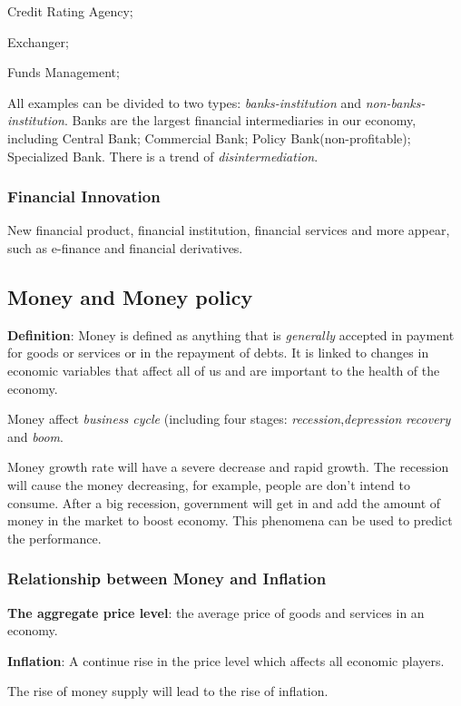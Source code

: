 \documentclass[10pt, a4paper]{article}
\begin{document}
            \quad Credit Rating Agency; 

            \quad Exchanger; 
            
            \quad Funds Management; 

        All examples can be divided to two types: \emph{banks-institution} and \emph{non-banks-institution}. Banks are the largest financial intermediaries in our economy, including Central Bank; Commercial Bank; Policy Bank(non-profitable); Specialized Bank. There is a trend of \emph{disintermediation}.
        
        \subsubsection{Financial Innovation}
            New financial product, financial institution, financial services and more appear, such as e-finance and financial derivatives. 
        \subsection{Money and Money policy}
            \textbf{Definition}: Money is defined as anything that is \emph{generally} accepted in payment for goods or services or in the repayment of debts. It is linked to changes in economic variables that affect all of us and are important to the health of the economy. 

            Money affect \emph{business cycle} (including four stages: \emph{recession},\emph{depression} \emph{recovery} and \emph{boom}. 

            Money growth rate will have a severe decrease and rapid growth. The recession will cause the money decreasing, for example, people are don't intend to consume. After a big recession, government will get in and add the amount of money in the market to boost economy. This phenomena can be used to  predict the performance.
            
            \subsubsection{Relationship between Money and Inflation} 
                \textbf{The aggregate price level}: the average price of goods and services in an economy. 
                
                \textbf{Inflation}: A continue rise in the price level which affects all economic players. 

                The rise of money supply will lead to the rise of inflation. 
\end{document}
